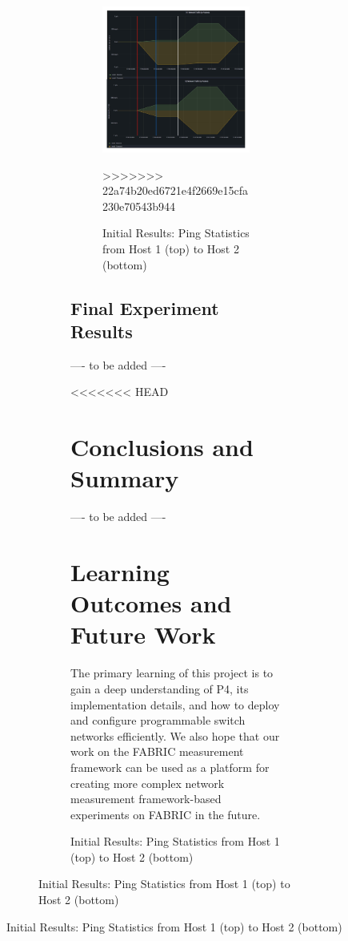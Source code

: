 \documentclass[conference]{IEEEtran}
\begin{document}
\begin{figure}[h!]
\begin{figure}[b]
\begin{figure}[t]
    \begin{figure}[b]
        \includegraphics[scale=0.35]{packetgraph.jpeg}
        \centering
        \caption{Initial Results: Ping Statistics from Host 1 (top) to Host 2 (bottom)}
>>>>>>> 22a74b20ed6721e4f2669e15cfa230e70543b944
    \end{figure}
        
    \subsection{Final Experiment Results}
    ---- to be added ----

<<<<<<< HEAD
    \section{Conclusions and Summary}
    ---- to be added ----
    
    \section{Learning Outcomes and Future Work}
    The primary learning of this project is to gain a deep understanding of P4, its implementation details, and how to deploy and configure programmable switch networks efficiently. We also hope that our work on the FABRIC measurement framework can be used as a platform for creating more complex network measurement framework-based experiments on FABRIC in the future.
        

\end{figure}
\end{figure}
\end{figure}
\end{document}
